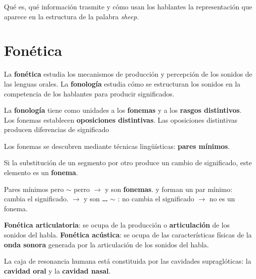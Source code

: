 \documentclass[12pt]{article}
\begin{document}
Qué es, qué información trasmite y cómo usan los hablantes la representación  que aparece en la estructura de la palabra \textit{sheep}.

\section{Fonética}

	\pex
\a La \textbf{fonética} estudia los mecanismos de producción y percepción de los sonidos de las lenguas orales.
\a La \textbf{fonología} estudia cómo se estructuran los sonidos en la competencia de los hablantes para producir significados.
\xe


	La \textbf{fonología} tiene como unidades a los \textbf{fonemas} y a los \textbf{rasgos distintivos}.
	\pex
\a Los fonemas establecen \textbf{oposiciones distintivas}.
\a Las oposiciones distintivas producen diferencias de significado
\xe


	Los fonemas se descubren mediante técnicas lingüísticas: \textbf{pares mínimos}.

\ex Si la substitución de un segmento por otro produce un cambio de significado, este elemento es un \textbf{fonema}.
\xe


	\pex Pares mínimos
\a	\textipa{[peRo]} pero $\sim$ \textipa{[pero]} perro $\longrightarrow$  y  son \textbf{fonemas}.
\a \textipa{[ban]} y \textipa{[pan]} forman un par mínimo: cambia el significado. $\longrightarrow$  y  son \textbf{\ldots}
\a \textipa{[kaDa]} $\sim$ \textipa{[kada]}: no cambia el significado $\longrightarrow$ \textipa{[D]} no es un fonema.
\xe

	\pex
\a \textbf{Fonética articulatoria}: se ocupa de la producción o \textbf{articulación} de los sonidos del habla. 
\a \textbf{Fonética acústica}: se ocupa de las características físicas de la \textbf{onda sonora} generada por la articulación de los sonidos del habla.
\xe


	\begin{center}
		\end{center}

	La caja de resonancia humana está constituida por las cavidades supraglóticas: la \textbf{cavidad oral} y la \textbf{cavidad nasal}.
	\begin{center}
		\end{center}
\end{document}
